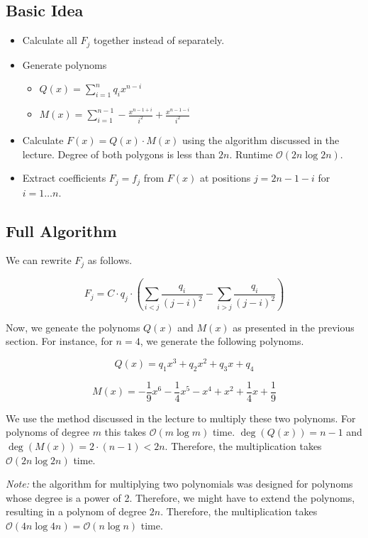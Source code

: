 \documentclass[12pt]{article}
\begin{document}
\subsection*{Basic Idea}
\begin{itemize}
	\item Calculate all $F_j$ together instead of separately.
	\item Generate polynoms  \begin{itemize}
		\item $Q(x) = \sum_{i=1}^{n} q_i x^{n-i}$ 
		\item $M(x) = \sum_{i=1}^{n-1} -\frac{x^{n-1+i}}{i^2} + \frac{x^{n-1-i}}{i^2}$
	\end{itemize}
	\item Calculate $F(x) = Q(x) \cdot M(x)$ using the algorithm discussed in the lecture. Degree of both polygons is less than $2n$. Runtime $\mathcal{O}(2n \log 2n)$.
	\item Extract coefficients $F_j = f_j$ from $F(x)$ at positions $j = 2n-1-i$ for $i=1 \ldots n$.
\end{itemize}

\subsection*{Full Algorithm}
We can rewrite $F_j$ as follows.

$$ F_j = C \cdot q_j \cdot \left( \sum_{i<j} \frac{q_i}{(j-i)^2} - \sum_{i > j} \frac{q_i}{(j - i)^2} \right) $$

Now, we geneate the polynoms $Q(x)$ and $M(x)$ as presented in the previous section. For instance, for $n=4$, we generate the following polynoms.

$$ Q(x) = q_1 x^3 + q_2 x^2 + q_3 x + q_4 $$

$$ M(x) = -\frac{1}{9} x^6 - \frac{1}{4} x^5 - x^4 + x^2 + \frac{1}{4} x + \frac{1}{9} $$

We use the method discussed in the lecture to multiply these two polynoms. For polynoms of degree $m$ this takes $\mathcal{O}(m \log m)$ time. $\deg(Q(x)) = n-1$ and $\deg(M(x)) = 2 \cdot (n - 1) < 2n$. Therefore, the multiplication takes $\mathcal{O}(2n \log 2n)$ time.

\emph{Note:} the algorithm for multiplying two polynomials was designed for polynoms whose degree is a power of 2. Therefore, we might have to extend the polynoms, resulting in a polynom of degree $2n$. Therefore, the multiplication takes $\mathcal{O}(4n \log 4n) = \mathcal{O}(n \log n)$ time.
\end{document}
